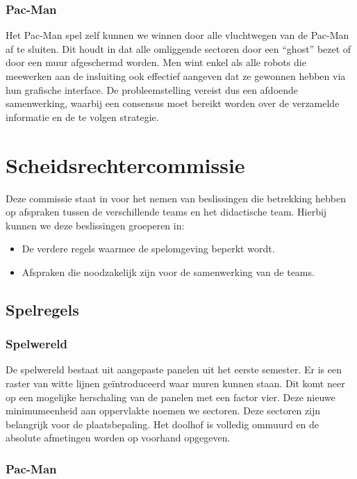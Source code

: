 \documentclass[12pt,a4paper]{report}
\begin{document}
\subsection{Pac-Man}

Het Pac-Man spel zelf kunnen we winnen door alle vluchtwegen van de Pac-Man af te sluiten. Dit houdt in dat alle omliggende sectoren door een ``ghost'' bezet of door een muur afgeschermd worden. Men wint enkel als alle robots die meewerken aan de insluiting ook effectief aangeven dat ze gewonnen hebben via hun grafische interface. De probleemstelling vereist dus een afdoende samenwerking, waarbij een consensus moet bereikt worden over de verzamelde informatie en de te volgen strategie.

\chapter{Scheidsrechtercommissie}

Deze commissie staat in voor het nemen van beslissingen die betrekking hebben op afspraken tussen de verschillende teams en het didactische team. Hierbij kunnen we deze beslissingen groeperen in:

\begin{itemize}
	\item De verdere regels waarmee de spelomgeving beperkt wordt.
	\item Afspraken die noodzakelijk zijn voor de samenwerking van de teams.
\end{itemize}

\section{Spelregels}

\subsection{Spelwereld}

De spelwereld bestaat uit aangepaste panelen uit het eerste semester. Er is een raster van witte lijnen ge\"introduceerd waar muren kunnen staan. Dit komt neer op een mogelijke herschaling van de panelen met een factor vier. Deze nieuwe minimumeenheid aan oppervlakte noemen we sectoren. Deze sectoren zijn belangrijk voor de plaatsbepaling. Het doolhof is volledig ommuurd en de absolute afmetingen worden op voorhand opgegeven.

\subsection{Pac-Man}
\end{document}
